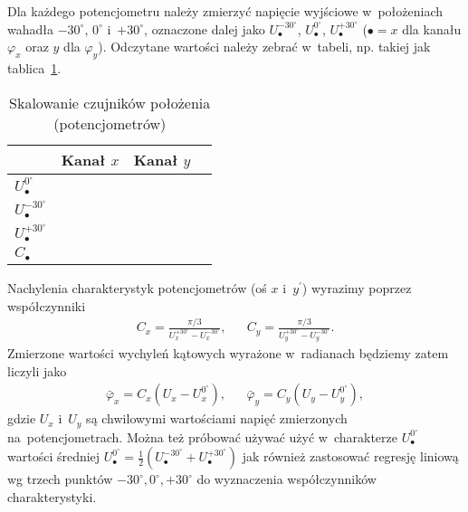 \documentclass[paper=a4,DIV=12]{lpas}
\begin{document}
Dla każdego potencjometru należy zmierzyć
napięcie wyjściowe w~położeniach wahadła $-30^{\circ}$, $0^{\circ}$
i~$+30^{\circ}$, oznaczone dalej jako $U_{\bullet}^{-30^{\circ}}$,
$U_{\bullet}^{0^{\circ}}$, $U_{\bullet}^{+30^{\circ}}$ ($\bullet=x$ dla kanału
$\varphi_x$ oraz $y$ dla $\varphi_y$). Odczytane wartości należy zebrać
w~tabeli, np. takiej jak tablica~\ref{tab:KM4WU}.
\begin{table}[htbp]
  \caption{Skalowanie czujników położenia (potencjometrów)}
  \label{tab:KM4WU}
  \centering
  \begin{tabular}{|l|c|c|c|}
    \hline
                                  & Kanał $x$ & Kanał $y$ \\ \hline
      $U_{\bullet}^{0^{\circ}}$   &           &           \\ \hline
      $U_{\bullet}^{-30^{\circ}}$ &           &           \\ \hline
      $U_{\bullet}^{+30^{\circ}}$ &           &           \\ \hline
      $C_{\bullet}$               &           &           \\ \hline
  \end{tabular}
\end{table}

Nachylenia charakterystyk potencjometrów (oś $x$ i~$y^{\prime}$) wyrazimy poprzez
współczynniki
\begin{align}
  & C_x = \frac{\pi/3}{U_x^{+30^{\circ}} - U_x^{-30^{\circ}}}, &
  & C_y = \frac{\pi/3}{U_y^{+30^{\circ}} - U_y^{-30^{\circ}}}. &
  \label{eq:XIRR2}
\end{align}
Zmierzone wartości wychyleń kątowych wyrażone w~radianach będziemy zatem liczyli jako
\begin{align}
  &\bar{\varphi}_x = C_x \left(U_x - U_x^{0^{\circ}}\right),&
  &\bar{\varphi}_y = C_y \left(U_y - U_y^{0^{\circ}}\right),&
  \label{eq:547XS}
\end{align}
gdzie $U_x$ i~$U_y$ są chwilowymi wartościami napięć zmierzonych
na~potencjometrach. Można też próbować używać użyć w~charakterze
$U_{\bullet}^{0^{\circ}}$ wartości średniej $U_{\bullet}^{0^{\circ}} =
\tfrac{1}{2}\left(U_{\bullet}^{-30^{\circ}} + U_{\bullet}^{+30^{\circ}}\right)$
jak również zastosować regresję liniową wg trzech punktów $-30^{\circ},
0^{\circ}, +30^{\circ}$ do wyznaczenia współczynników charakterystyki.
\end{document}
